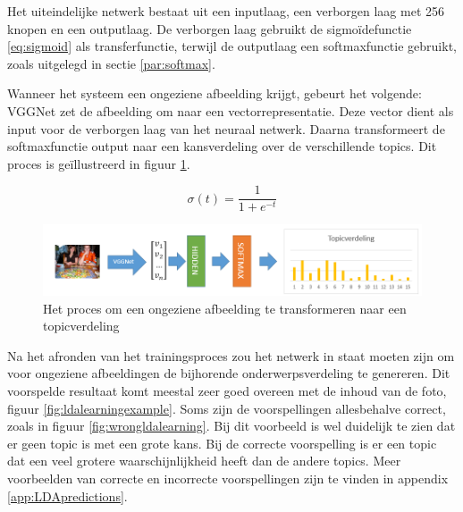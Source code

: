 Het uiteindelijke netwerk bestaat uit een inputlaag, een verborgen laag met 256 knopen en een outputlaag. De verborgen laag gebruikt de sigmo\"idefunctie \eqref{eq:sigmoid} als transferfunctie, terwijl de outputlaag een softmaxfunctie gebruikt, zoals uitgelegd in sectie \ref{par:softmax}.

Wanneer het systeem een ongeziene afbeelding krijgt, gebeurt het volgende: VGGNet zet de afbeelding om naar een vectorrepresentatie. Deze vector dient als input voor de verborgen laag van het neuraal netwerk. Daarna transformeert de softmaxfunctie output naar een kansverdeling over de verschillende topics. Dit proces is ge\"illustreerd in figuur \ref{fig:learningLDA}.

\begin{equation}
    \sigma(t) = \frac{1}{1 + e^{-t}}
    \label{eq:sigmoid}
\end{equation}

\begin{figure}[tb]
    \centering
    \includegraphics[width=\linewidth]{Images/LDANetwerk.PNG}
    \caption{Het proces om een ongeziene afbeelding te transformeren naar een topicverdeling}
    \label{fig:learningLDA}
\end{figure}

Na het afronden van het trainingsproces zou het netwerk in staat moeten zijn om voor ongeziene afbeeldingen de bijhorende onderwerpsverdeling te genereren. Dit voorspelde resultaat komt meestal zeer goed overeen met de inhoud van de foto, figuur \ref{fig:ldalearningexample}. Soms zijn de voorspellingen allesbehalve correct, zoals in figuur \ref{fig:wrongldalearning}. Bij dit voorbeeld is wel duidelijk te zien dat er geen topic is met een grote kans. Bij de correcte voorspelling is er een topic dat een veel grotere waarschijnlijkheid heeft dan de andere topics. Meer voorbeelden van correcte en incorrecte voorspellingen zijn te vinden in appendix \ref{app:LDApredictions}.

